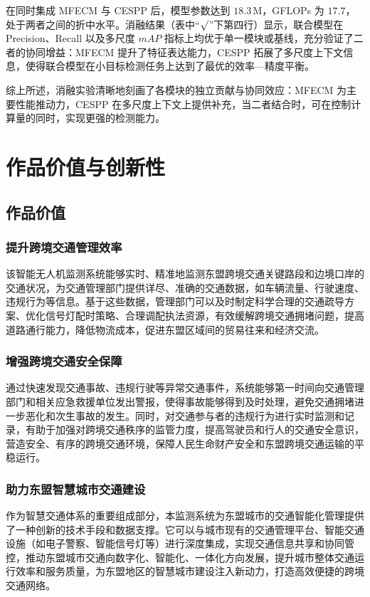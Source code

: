 \documentclass[runningheads]{llncs}
\begin{document}
在同时集成 MFECM 与 CESPP 后，模型参数达到 $18.3\,\mathrm{M}$，GFLOPs 为 $17.7$，处于两者之间的折中水平。消融结果（表中“$\surd$”下第四行）显示，联合模型在 Precision、Recall 以及多尺度 $mAP$ 指标上均优于单一模块或基线，充分验证了二者的协同增益：MFECM 提升了特征表达能力，CESPP 拓展了多尺度上下文信息，使得联合模型在小目标检测任务上达到了最优的效率—精度平衡。

综上所述，消融实验清晰地刻画了各模块的独立贡献与协同效应：MFECM 为主要性能推动力，CESPP 在多尺度上下文上提供补充，当二者结合时，可在控制计算量的同时，实现更强的检测能力。





\section{作品价值与创新性}

\subsection{作品价值}

\subsubsection{提升跨境交通管理效率}
该智能无人机监测系统能够实时、精准地监测东盟跨境交通关键路段和边境口岸的交通状况，为交通管理部门提供详尽、准确的交通数据，如车辆流量、行驶速度、违规行为等信息。基于这些数据，管理部门可以及时制定科学合理的交通疏导方案、优化信号灯配时策略、合理调配执法资源，有效缓解跨境交通拥堵问题，提高道路通行能力，降低物流成本，促进东盟区域间的贸易往来和经济交流。

\subsubsection{增强跨境交通安全保障}
通过快速发现交通事故、违规行驶等异常交通事件，系统能够第一时间向交通管理部门和相关应急救援单位发出警报，使得事故能够得到及时处理，避免交通拥堵进一步恶化和次生事故的发生。同时，对交通参与者的违规行为进行实时监测和记录，有助于加强对跨境交通秩序的监管力度，提高驾驶员和行人的交通安全意识，营造安全、有序的跨境交通环境，保障人民生命财产安全和东盟跨境交通运输的平稳运行。

\subsubsection{助力东盟智慧城市交通建设}
作为智慧交通体系的重要组成部分，本监测系统为东盟城市的交通智能化管理提供了一种创新的技术手段和数据支撑。它可以与城市现有的交通管理平台、智能交通设施（如电子警察、智能信号灯等）进行深度集成，实现交通信息共享和协同管控，推动东盟城市交通向数字化、智能化、一体化方向发展，提升城市整体交通运行效率和服务质量，为东盟地区的智慧城市建设注入新动力，打造高效便捷的跨境交通网络。
\end{document}

